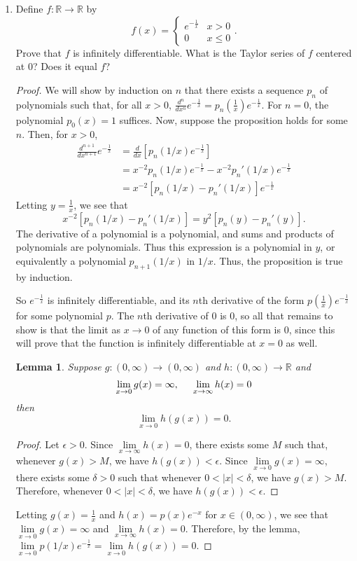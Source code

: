 \documentclass[10pt]{article}
\newcommand{\R}{\mathbb{R}}
\newtheorem*{lem}{Lemma}
\begin{document}
\begin{enumerate}
\item Define $f: \R \rightarrow \R$ by
$$
f(x) =
\begin{cases}
e^{-\frac{1}{x}} & x>0 \\
0 & x \leq 0
\end{cases}.
$$
Prove that $f$ is infinitely differentiable.  What is the Taylor series of $f$ centered at 0?  Does it equal $f$?

\begin{proof}
We will show by induction on $n$ that there exists a sequence $p_n$ of polynomials such that, for all $x > 0$, $\frac{d^n}{dx^n}e^{-\frac{1}{x}} = p_n(\frac{1}{x})e^{-\frac{1}{x}}$.  For $n = 0$, the polynomial $p_0(x) = 1$ suffices.  Now, suppose the proposition holds for some $n$.  Then, for $x > 0$,
\begin{align*}
\frac{d^{n+1}}{dx^{n+1}}e^{-\frac{1}{x}}
&= \frac{d}{dx}[p_n(1/x)e^{-\frac{1}{x}}]
\\
&=  x^{-2} p_n(1/x)e^{-\frac{1}{x}} - x^{-2}p_n'(1/x)e^{-\frac{1}{x}}
\\
&= x^{-2} [p_n(1/x) - p_n'(1/x)] e^{-\frac{1}{x}}
\end{align*}
Letting $y = \frac{1}{x}$, we see that
$$
x^{-2} [p_n(1/x) - p_n'(1/x)] = y^2 [p_n(y) - p_n'(y)].
$$
The derivative of a polynomial is a polynomial, and sums and products of polynomials are polynomials.  Thus this expression is a polynomial in $y$, or equivalently a polynomial $p_{n+1}(1/x)$ in $1/x$.   Thus, the proposition is true by induction.

So $e^{-\frac{1}{x}}$ is infinitely differentiable, and its $n$th derivative of the form $p(\frac{1}{x})e^{-\frac{1}{x}}$ for some polynomial $p$.  The $n$th derivative of $0$ is $0$, so all that remains to show is that the limit as $x \rightarrow 0$ of any function of this form is 0, since this will prove that the function is infinitely differentiable at $x=0$ as well.

\begin{lem}
Suppose $g: (0,\infty) \rightarrow (0,\infty)$ and $h: (0,\infty) \rightarrow \R$ and
$$
\lim\limits_{x \rightarrow 0} g(x) = \infty, \hspace{.5cm} \lim\limits_{x \rightarrow \infty} h(x) = 0
$$
then
$$
\lim\limits_{x \rightarrow 0} h(g(x)) = 0.
$$
\end{lem}
\begin{proof}
Let $\epsilon > 0$.  Since $\lim\limits_{x \rightarrow \infty} h(x) = 0$, there exists some $M$ such that, whenever $g(x) > M$, we have $h(g(x)) < \epsilon$.  Since $\lim\limits_{x \rightarrow 0} g(x) = \infty$, there exists some $\delta > 0$ such that whenever $0 < |x| < \delta$, we have $g(x) > M$.  Therefore, whenever $0 < |x| < \delta$, we have $h(g(x)) < \epsilon$.
\end{proof}
Letting $g(x) = \frac{1}{x}$ and $h(x) = p(x)e^{-x}$ for $x \in (0, \infty)$, we see that $\lim\limits_{x \rightarrow 0} g(x) = \infty$ and $\lim\limits_{x \rightarrow \infty} h(x) = 0$.  Therefore, by the lemma, $\lim\limits_{x \rightarrow 0} p(1/x)e^{-\frac{1}{x}} = \lim\limits_{x \rightarrow 0} h(g(x)) = 0$.


\end{proof}
\end{enumerate}
\end{document}
